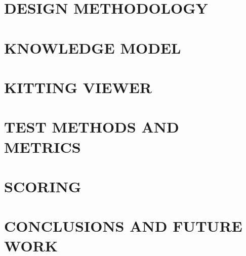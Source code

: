 \section{DESIGN METHODOLOGY} 

\section{KNOWLEDGE MODEL}

\section{KITTING VIEWER}
\label{sect:KittingViewer}


\section{TEST METHODS AND METRICS}
\label{sect:Metrics}


\section{SCORING} 
\label{sect:Results}



\addtolength{\textheight}{-4cm}


\section{CONCLUSIONS AND FUTURE WORK}
\label{sect:Conclusions}





